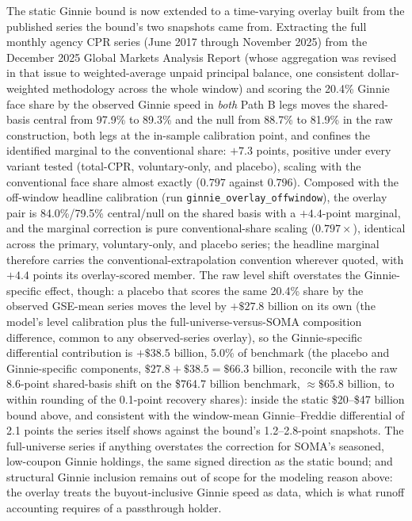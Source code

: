 \documentclass[12pt]{article}
\begin{document}
The static Ginnie bound is now extended to a time-varying overlay built from the published series the bound's two snapshots came from. Extracting the full monthly agency CPR series (June 2017 through November 2025) from the December 2025 Global Markets Analysis Report (whose aggregation was revised in that issue to weighted-average unpaid principal balance, one consistent dollar-weighted methodology across the whole window) and scoring the 20.4\% Ginnie face share by the observed Ginnie speed in \emph{both} Path B legs moves the shared-basis central from 97.9\% to 89.3\% and the null from 88.7\% to 81.9\% in the raw construction, both legs at the in-sample calibration point, and confines the identified marginal to the conventional share: $+7.3$ points, positive under every variant tested (total-CPR, voluntary-only, and placebo), scaling with the conventional face share almost exactly ($0.797$ against $0.796$). Composed with the off-window headline calibration (run \texttt{ginnie\_overlay\_offwindow}), the overlay pair is 84.0\%/79.5\% central/null on the shared basis with a $+4.4$-point marginal, and the marginal correction is pure conventional-share scaling ($0.797\times$), identical across the primary, voluntary-only, and placebo series; the headline marginal therefore carries the conventional-extrapolation convention wherever quoted, with $+4.4$ points its overlay-scored member. The raw level shift overstates the Ginnie-specific effect, though: a placebo that scores the same 20.4\% share by the observed GSE-mean series moves the level by $+\$27.8$ billion on its own (the model's level calibration plus the full-universe-versus-SOMA composition difference, common to any observed-series overlay), so the Ginnie-specific differential contribution is $+\$38.5$ billion, 5.0\% of benchmark (the placebo and Ginnie-specific components, $\$27.8 + \$38.5 = \$66.3$ billion, reconcile with the raw 8.6-point shared-basis shift on the \$764.7 billion benchmark, $\approx\$65.8$ billion, to within rounding of the 0.1-point recovery shares): inside the static \$20--\$47 billion bound above, and consistent with the window-mean Ginnie--Freddie differential of 2.1 points the series itself shows against the bound's 1.2--2.8-point snapshots. The full-universe series if anything overstates the correction for SOMA's seasoned, low-coupon Ginnie holdings, the same signed direction as the static bound; and structural Ginnie inclusion remains out of scope for the modeling reason above: the overlay treats the buyout-inclusive Ginnie speed as data, which is what runoff accounting requires of a passthrough holder.
\end{document}
